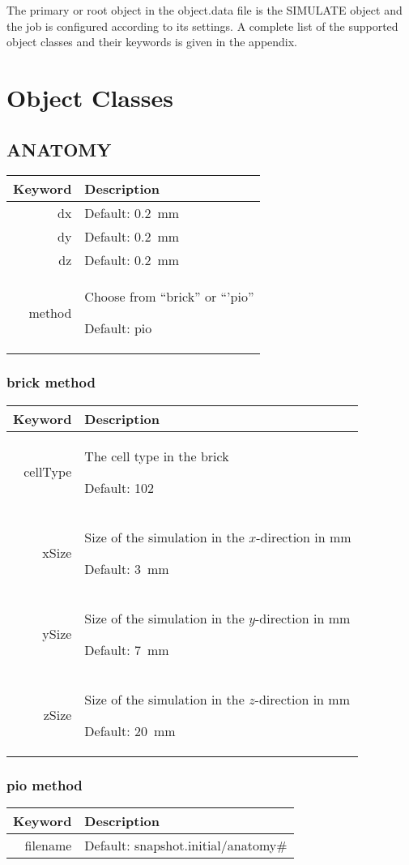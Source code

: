 \documentclass{article}
\begin{document}
The primary or root object in the object.data file is the SIMULATE
object and the job is configured according to its settings.  A complete
list of the supported object classes and their keywords is given in the
appendix.




\appendix

\section{Object Classes}

\newenvironment{keywords}
{
  \par\vspace{12pt}\noindent
  \begin{tabular}{|r|p{0.7\textwidth}|}
    \hline
    Keyword & Description \\ \hline
  }
  {
  \end{tabular}
}

\def\kw#1#2#3{%
  #1 & {#2 \par Default: #3}\\ \hline%
}


\subsection{ANATOMY}
\begin{keywords}
  \kw{dx}{}{0.2~mm}
  \kw{dy}{}{0.2~mm}
  \kw{dz}{}{0.2~mm}
  \kw{method}{Choose from ``brick'' or ``'pio''}{pio}
\end{keywords}

\subsubsection{brick method}
\begin{keywords}
  \kw{cellType}{The cell type in the brick}{102}
  \kw{xSize}{Size of the simulation in the $x$-direction in mm}{3~mm}
  \kw{ySize}{Size of the simulation in the $y$-direction in mm}{7~mm}
  \kw{zSize}{Size of the simulation in the $z$-direction in mm}{20~mm}
\end{keywords}

\subsubsection{pio method}
\begin{keywords}
  \kw{filename}{}{snapshot.initial/anatomy\#}
\end{keywords}
\end{document}
